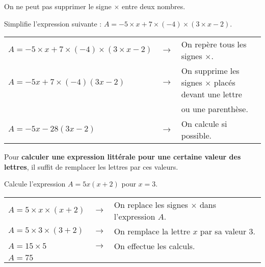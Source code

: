 \begin{remarque}
On ne peut pas supprimer le signe $\times$ entre deux nombres.
\end{remarque}

\begin{exemple*1}
Simplifie l'expression suivante : $A = -5 \times x + 7 \times (-4) \times (3 \times x -2)$.

\correction

\begin{tabular}{lcl}
$A = -5 \times x + 7 \times (-4) \times (3 \times x -2)$ & $\longrightarrow$ & On repère tous les signes $\times$. \\
$A = -5x + 7 \times (-4)(3x -2)$ & $\longrightarrow$ & On supprime les signes $\times$ placés devant une lettre \\
& &  ou une parenthèse. \\
$A = -5x -28(3x -2)$ & $\longrightarrow$ & On calcule si possible. \\
\end{tabular}

\end{exemple*1} 


\begin{methode*1}
Pour \textbf{calculer une expression littérale pour une certaine valeur des lettres}, il suffit de remplacer les lettres par ces valeurs. 
\exercice

Calcule l'expression $A = 5x(x + 2)$ pour $x = 3$.

\correction

\begin{tabular}{lcl}
$A = 5 \times x \times (x + 2)$ & $\longrightarrow$ & On replace les signes $\times$ dans l'expression $A$. \\
$A = 5 \times 3 \times (3 + 2)$ & $\longrightarrow$ & On remplace la lettre $x$ par sa valeur 3. \\
$A = 15 \times 5$ & $\longrightarrow$ & On effectue les calculs. \\
$A = 75$ & & \\
\end{tabular}

\end{methode*1}




